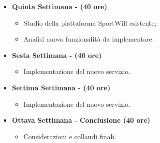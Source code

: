 {\begin{itemize}
\begin{itemize}
        \end{itemize}
        \item \textbf{Quinta Settimana - (40 ore)} 
        \begin{itemize}
            \item Studio della piattaforma SportWill esistente;
            \item Analisi nuova funzionalità da implementare.
        \end{itemize}
        \item \textbf{Sesta Settimana - (40 ore)} 
        \begin{itemize}
            \item Implementazione del nuovo servizio.
        \end{itemize}
        \item \textbf{Settima Settimana - (40 ore)} 
        \begin{itemize}
            \item Implementazione del nuovo servizio.
        \end{itemize}
        \item \textbf{Ottava Settimana - Conclusione (40 ore)} 
        \begin{itemize}
            \item Considerazioni e collaudi finali.
        \end{itemize}
    \end{itemize}
}


\newcommand{\obiettiviObbligatori}{
	 \item \underline{\textit{O01}}: Acquisizione competenze sulle tematiche sopra descritte;
	 \item \underline{\textit{O02}}: Capacità di raggiungere gli obiettivi richiesti in autonomia seguendo il cronoprogramma;
	 \item \underline{\textit{O03}}: Portare a termine l’implementazione dei microservizi richiesti con una percentuale di superamento pari al 80.
	 
}

\newcommand{\obiettiviDesiderabili}{
	 \item \underline{\textit{D01}}: Portare a termine l’implementazione dei microservizi richiesti con una percentuale di superamento pari al 100.
}

\newcommand{\obiettiviFacoltativi}{
	 \item \underline{\textit{F01}}: Utilizzo della containerizzazione per portare tutti i microservizi su Docker.
}